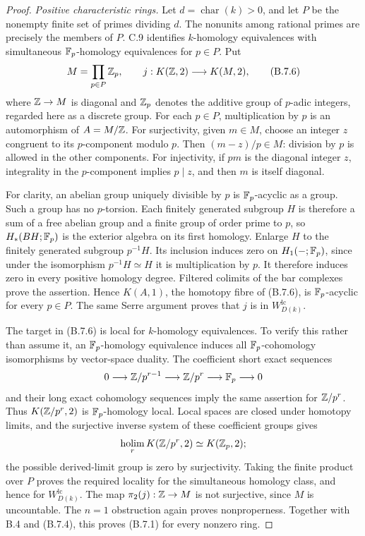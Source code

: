\begin{proof}
\emph{Positive characteristic rings.}
Let $d=\operatorname{char}(k)>0$, and let $P$ be
the nonempty finite set of primes dividing $d$.
The nonunits among rational primes are precisely
the members of $P$. C.9 identifies $k$-homology
equivalences with simultaneous $\mathbb F_p$-homology
equivalences for $p\in P$. Put
\[
 M=\prod_{p\in P}\mathbb Z_p,
 \qquad j:K(\mathbb Z,2)\longrightarrow K(M,2),
\tag{B.7.6}
\]
where $\mathbb Z\to M$ is diagonal and $\mathbb Z_p$ denotes
the additive group of $p$-adic integers, regarded here as a discrete group.
For each $p\in P$, multiplication by $p$ is an
automorphism of $A=M/\mathbb Z$. For surjectivity, given
$m\in M$, choose an integer $z$ congruent to its
$p$-component modulo $p$. Then $(m-z)/p\in M$:
division by $p$ is allowed in the other components.
For injectivity, if $pm$ is the diagonal integer
$z$, integrality in the $p$-component implies
$p\mid z$, and then $m$ is itself diagonal.

For clarity, an abelian group uniquely divisible
by $p$ is $\mathbb F_p$-acyclic as a group. Such a group
has no $p$-torsion. Each finitely generated subgroup
$H$ is therefore a sum of a free abelian group and
a finite group of order prime to $p$, so
$H_*(BH;\mathbb F_p)$ is the exterior algebra on its first
homology. Enlarge $H$ to the finitely generated
subgroup $p^{-1}H$. Its inclusion induces zero on
$H_1(-;\mathbb F_p)$, since under the isomorphism
$p^{-1}H\simeq H$ it is multiplication by $p$.
It therefore induces zero in every positive
homology degree. Filtered colimits of the bar
complexes prove the assertion. Hence $K(A,1)$,
the homotopy fibre of (B.7.6), is $\mathbb F_p$-acyclic
for every $p\in P$. The same Serre argument proves
that $j$ is in $W_{D(k)}^{\mathrm{lc}}$.

The target in (B.7.6) is local for $k$-homology
equivalences. To verify this rather than assume
it, an $\mathbb F_p$-homology equivalence induces all
$\mathbb F_p$-cohomology isomorphisms by vector-space
duality. The coefficient short exact sequences
\[
 0\longrightarrow\mathbb Z/p^{r-1}
 \longrightarrow\mathbb Z/p^r\longrightarrow\mathbb F_p
 \longrightarrow0
\]
and their long exact cohomology sequences imply
the same assertion for $\mathbb Z/p^r$. Thus
$K(\mathbb Z/p^r,2)$ is $\mathbb F_p$-homology local.
Local spaces are closed under homotopy limits,
and the surjective inverse system of these
coefficient groups gives
\[
 \operatorname*{holim}_rK(\mathbb Z/p^r,2)\simeq K(\mathbb Z_p,2);
\]
the possible derived-limit group is zero by
surjectivity. Taking the finite product over $P$
proves the required locality for the simultaneous
homology class, and hence for
$W_{D(k)}^{\mathrm{lc}}$. The map
$\pi_2(j):\mathbb Z\to M$ is not surjective, since $M$
is uncountable. The $n=1$ obstruction again
proves nonproperness. Together with B.4 and
(B.7.4), this proves (B.7.1) for every nonzero ring.


\end{proof}
